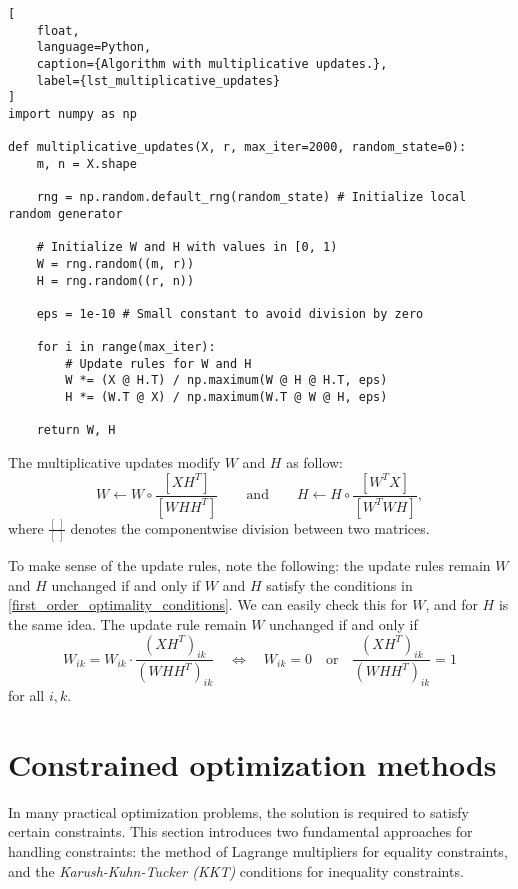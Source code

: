 \documentclass{amsart}
\begin{document}
\begin{lstlisting}[
    float,
    language=Python,
    caption={Algorithm with multiplicative updates.},
    label={lst_multiplicative_updates}
]
import numpy as np

def multiplicative_updates(X, r, max_iter=2000, random_state=0):
    m, n = X.shape

    rng = np.random.default_rng(random_state) # Initialize local random generator

    # Initialize W and H with values in [0, 1)
    W = rng.random((m, r))
    H = rng.random((r, n)) 
    
    eps = 1e-10 # Small constant to avoid division by zero

    for i in range(max_iter):
        # Update rules for W and H
        W *= (X @ H.T) / np.maximum(W @ H @ H.T, eps)
        H *= (W.T @ X) / np.maximum(W.T @ W @ H, eps)

    return W, H
\end{lstlisting}

\bigskip

The multiplicative updates modify $W$ and $H$ as follow:
\begin{equation}
    \label{multiplicative_updates}
    W \leftarrow W\circ \frac{\left[XH^T\right]}{\left[WHH^T\right]} \qquad \text{and}\qquad H \leftarrow H\circ \frac{\left[W^TX\right]}{\left[W^TWH\right]},
\end{equation}
where $\frac{[\ ]}{[\ ]}$ denotes the componentwise division between two matrices.

To make sense of the update rules, note the following: the update rules remain $W$ and $H$ unchanged if and only if $W$ and $H$ satisfy the conditions in \eqref{first_order_optimality_conditions}. We can easily check this for $W$, and for $H$ is the same idea. The update rule remain $W$ unchanged if and only if
\[
    W_{ik} = W_{ik}\cdot \frac{(XH^T)_{ik}}{(WHH^T)_{ik}}\quad \Leftrightarrow\quad W_{ik}=0\quad \text{or}\quad \frac{(XH^T)_{ik}}{(WHH^T)_{ik}}=1
\]
for all $i,k$.

\appendix

\section{Constrained optimization methods}\label{constrained_optimization_methods}

In many practical optimization problems, the solution is required to satisfy certain constraints. This section introduces two fundamental approaches for handling constraints: the method of Lagrange multipliers for equality constraints, and the {\it Karush-Kuhn-Tucker (KKT)} conditions for inequality constraints.
\end{document}
